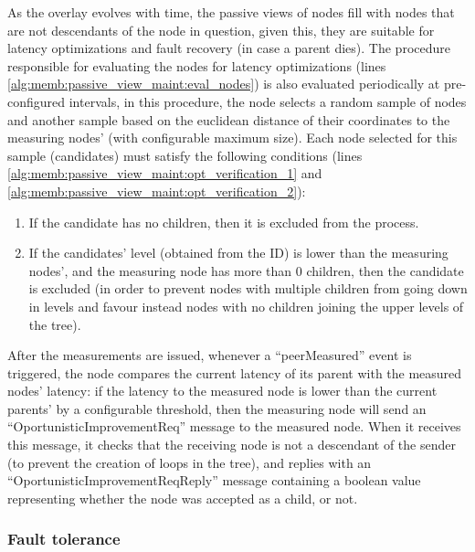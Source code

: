 As the overlay evolves with time, the passive views of nodes fill with nodes that are not descendants of the node in question, given this, they are suitable for latency optimizations and fault recovery (in case a parent dies). The procedure responsible for evaluating the nodes for latency optimizations (lines \ref{alg:memb:passive_view_maint:eval_nodes}) is also evaluated periodically at pre-configured intervals, in this procedure, the node selects a random sample of nodes and another sample based on the euclidean distance of their coordinates to the measuring nodes' (with configurable maximum size). Each node selected for this sample (candidates) must satisfy the following conditions (lines \ref{alg:memb:passive_view_maint:opt_verification_1} and \ref{alg:memb:passive_view_maint:opt_verification_2}): 

\begin{enumerate}
    \item If the candidate has no children, then it is excluded from the process.
    
    \item If the candidates' level (obtained from the ID) is lower than the measuring nodes', and the measuring node has more than 0 children, then the candidate is excluded (in order to prevent nodes with multiple children from going down in levels and favour instead nodes with no children joining the upper levels of the tree).
\end{enumerate}

After the measurements are issued, whenever a ``peerMeasured'' event is triggered, the node compares the current latency of its parent with the measured nodes' latency: if the latency to the measured node is lower than the current parents' by a configurable threshold, then the measuring node will send an ``OportunisticImprovementReq'' message to the measured node. When it receives this message, it checks that the receiving node is not a descendant of the sender (to prevent the creation of loops in the tree), and replies with an ``OportunisticImprovementReqReply'' message containing a boolean value representing whether the node was accepted as a child, or not.

\subsubsection{Fault tolerance}

